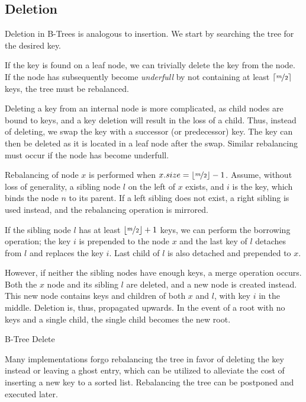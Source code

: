 \subsection{Deletion}

Deletion in B-Trees is analogous to insertion. We start by searching the tree for the desired key.

If the key is found on a leaf node, we can trivially delete the key from the node. If the node has subsequently become \textit{underfull} by not containing at least $\lceil\nicefrac{m}{2}\rceil$ keys, the tree must be rebalanced.

Deleting a key from an internal node is more complicated, as child nodes are bound to keys, and a key deletion will result in the loss of a child. Thus, instead of deleting, we swap the key with a successor (or predecessor) key. The key can then be deleted as it is located in a leaf node after the swap. Similar rebalancing must occur if the node has become underfull.

Rebalancing of node $x$ is performed when $x.size = \lfloor\nicefrac{m}{2}\rfloor - 1$. Assume, without loss of generality, a sibling node $l$ on the left of $x$ exists, and $i$ is the key, which binds the node $n$ to its parent. If a left sibling does not exist, a right sibling is used instead, and the rebalancing operation is mirrored.

If the sibling node $l$ has at least $\lfloor\nicefrac{m}{2}\rfloor + 1$ keys, we can perform the borrowing operation; the key $i$ is prepended to the node $x$ and the last key of $l$ detaches from $l$ and replaces the key $i$. Last child of $l$ is also detached and prepended to $x$.

However, if neither the sibling nodes have enough keys, a merge operation occurs. Both the $x$ node and its sibling $l$ are deleted, and a new node is created instead. This new node contains keys and children of both $x$ and $l$, with key $i$ in the middle. Deletion is, thus, propagated upwards. In the event of a root with no keys and a single child, the single child becomes the new root.

\begin{algorithm}
  \caption{B-Tree Delete}\label{alg:b-tree-delete}
\end{algorithm}

Many implementations forgo rebalancing the tree in favor of deleting the key instead or leaving a ghost entry, which can be utilized to alleviate the cost of inserting a new key to a sorted list. Rebalancing the tree can be postponed and executed later.

